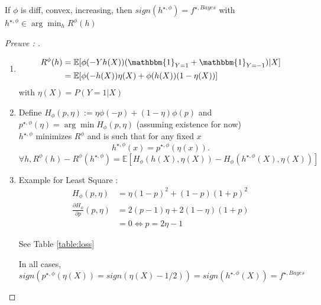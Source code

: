 \begin{lem}[]
    If $ \phi  $ is diff, convex, increasing, then $ sign(h^{\star, \phi }) = f^{\star, Bayes} $ with $ h^{\star, \phi }  \in  \arg \min_h R^\phi (h)$ 
\end{lem}
\begin{proof}[Preuve : ]
    \begin{enumerate}
        \item \begin{align*}
            R^\phi (h) &= \mathbb{E}[\phi (-Yh(X))(\mathbbm{1}_{Y=1} + \mathbbm{1}_{Y = -1}) | X] \\ 
                &= \mathbb{E}[\phi (-h(X)) \eta (X) + \phi (h(X)) (1 - \eta (X))]
        \end{align*}
        with $ \eta (X) = P(Y=1 | X) $
        
        \item Define $ H_\phi (p, \eta ) := \eta \phi (-p) + (1 - \eta ) \phi (p) $ and $ p^{\star , \phi }(\eta ) = \arg \min H_\phi (p, \eta ) $ (assuming existence for now) \\
        $ h^{\star , \phi }  $ minimizes $ R^\phi  $  and is such that for any fixed $ x $ 
        \[
            h^{\star , \phi }(x) = p^{\star , \phi }(\eta (x))
        .\]
        $ \forall h, R^\phi (h) - R^\phi (h^{\star , \phi }) = \mathbb{E}[H_\phi (h(X), \eta (X)) - H_\phi (h^{\star , \phi }(X), \eta (X))] $ 
        
        \item Example for Least Square : \begin{align*}
            H_\phi (p, \eta ) &= \eta (1 - p)^2 + (1 - p)(1 + p)^2 \\
            \frac{\partial H_\phi }{\partial p} (p , \eta ) &= 2 (p -1) \eta + 2(1 - \eta )(1+p) \\
                    &= 0 \Leftrightarrow p = 2 \eta - 1
        \end{align*} 


        See Table \ref*{table:loss}
        
        In all cases, $ sign(p^{\star , \phi }(\eta (X)) = sign(\eta (X) - 1/2)) = sign(h^{\star , \phi }(X)) = f^{\star , Bayes}$ 


\end{enumerate}
\end{proof}
